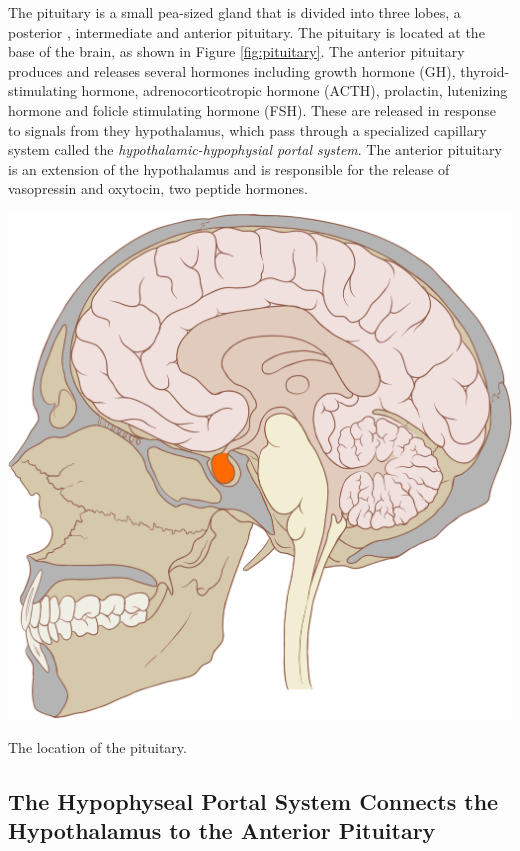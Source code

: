 \documentclass{tufte-handout}
\begin{document}
The pituitary is a small pea-sized gland that is divided into three lobes, a posterior , intermediate and anterior pituitary.  The pituitary is located at the base of the brain, as shown in Figure \ref{fig:pituitary}.  The anterior pituitary produces and releases several hormones including growth hormone (GH), thyroid-stimulating hormone, adrenocorticotropic hormone (ACTH), prolactin, lutenizing hormone and folicle stimulating hormone (FSH).  These are released in response to signals from they hypothalamus, which pass through a specialized capillary system called the \emph{hypothalamic-hypophysial portal system}.  The anterior pituitary is an extension of the hypothalamus and is responsible for the release of vasopressin and oxytocin, two peptide hormones. 

\begin{marginfigure}
  \includegraphics{figures/pituitary}
  \caption{The location of the pituitary.}
    \label{fig:pituitary}
\end{marginfigure}

\subsection{The Hypophyseal Portal System Connects the Hypothalamus to the Anterior Pituitary}
\end{document}
